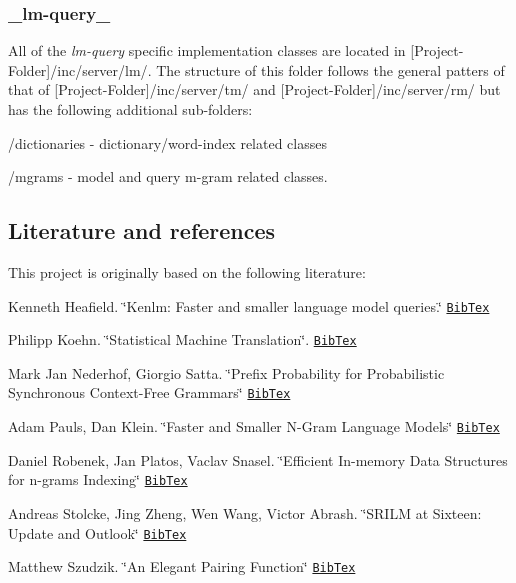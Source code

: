 \subsubsection*{\+\_\+lm-\/query\+\_\+}

All of the {\itshape lm-\/query} specific implementation classes are located in {\ttfamily \mbox{[}Project-\/\+Folder\mbox{]}/inc/server/lm/}. The structure of this folder follows the general patters of that of {\ttfamily \mbox{[}Project-\/\+Folder\mbox{]}/inc/server/tm/} and {\ttfamily \mbox{[}Project-\/\+Folder\mbox{]}/inc/server/rm/} but has the following additional sub-\/folders\+:


\begin{DoxyItemize}
\item {\ttfamily /dictionaries} -\/ dictionary/word-\/index related classes
\item {\ttfamily /mgrams} -\/ model and query m-\/gram related classes.
\end{DoxyItemize}

\subsection*{Literature and references}

This project is originally based on the following literature\+:


\begin{DoxyItemize}
\item Kenneth Heafield. \char`\"{}\+Kenlm\+: Faster and smaller language model queries.\char`\"{} \href{./doc/bibtex/Heafield_WMT11.bib}{\tt Bib\+Tex}
\item Philipp Koehn. \char`\"{}\+Statistical Machine Translation\char`\"{}. \href{./doc/bibtex/Koehn_SMT_Book10.bib}{\tt Bib\+Tex}
\item Mark Jan Nederhof, Giorgio Satta. \char`\"{}\+Prefix Probability for Probabilistic Synchronous Context-\/\+Free Grammars\char`\"{} \href{./doc/bibtex/NederhofSatta_NLP11.bib}{\tt Bib\+Tex}
\item Adam Pauls, Dan Klein. \char`\"{}\+Faster and Smaller N-\/\+Gram Language Models\char`\"{} \href{./doc/bibtex/PaulsKlein_ACL11.bib}{\tt Bib\+Tex}
\item Daniel Robenek, Jan Platos, Vaclav Snasel. \char`\"{}\+Efficient In-\/memory Data Structures for n-\/grams Indexing\char`\"{} \href{./doc/bibtex/RobenekPlatosSnasel_DATESO13.bib}{\tt Bib\+Tex}
\item Andreas Stolcke, Jing Zheng, Wen Wang, Victor Abrash. \char`\"{}\+S\+R\+I\+L\+M at Sixteen\+: Update and Outlook\char`\"{} \href{./doc/bibtex/StolckeZhengWangAbrash_ASRU11.bib}{\tt Bib\+Tex}
\item Matthew Szudzik. \char`\"{}\+An Elegant Pairing Function\char`\"{} \href{./doc/bibtex/Szudzik_NKS06.bib}{\tt Bib\+Tex}
\end{DoxyItemize}

